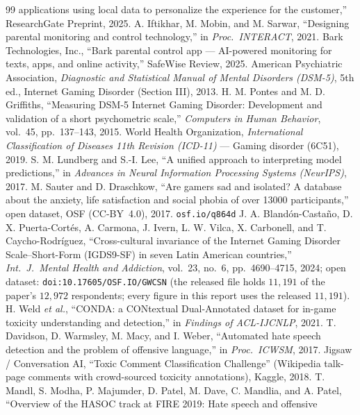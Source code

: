 \documentclass[11pt,a4paper]{article}
\begin{document}
\begin{thebibliography}{99}
applications using local data to personalize the experience for the customer,''
ResearchGate Preprint, 2025.
 A. Iftikhar, M. Mobin, and M. Sarwar, ``Designing parental
monitoring and control technology,'' in \emph{Proc.\ INTERACT}, 2021.
 Bark Technologies, Inc., ``Bark parental control app --- AI-powered
monitoring for texts, apps, and online activity,'' SafeWise Review, 2025.
 American Psychiatric Association, \emph{Diagnostic and Statistical Manual
of Mental Disorders (DSM-5)}, 5th ed., Internet Gaming Disorder (Section III), 2013.
 H. M. Pontes and M. D. Griffiths, ``Measuring DSM-5 Internet Gaming
Disorder: Development and validation of a short psychometric scale,'' \emph{Computers in
Human Behavior}, vol.\ 45, pp.\ 137--143, 2015.
 World Health Organization, \emph{International Classification of Diseases
11th Revision (ICD-11)} --- Gaming disorder (6C51), 2019.
 S. M. Lundberg and S.-I. Lee, ``A unified approach to interpreting
model predictions,'' in \emph{Advances in Neural Information Processing Systems
(NeurIPS)}, 2017.
 M. Sauter and D. Draschkow, ``Are gamers sad and isolated? A database
about the anxiety, life satisfaction and social phobia of over 13000 participants,''
open dataset, OSF (CC-BY~4.0), 2017. \texttt{osf.io/q864d}
 J. A. Bland\'on-Casta\~no, D. X. Puerta-Cort\'es, A. Carmona,
J. Ivern, L. W. Vilca, X. Carbonell, and T. Caycho-Rodr\'iguez, ``Cross-cultural invariance of
the Internet Gaming Disorder Scale--Short-Form (IGDS9-SF) in seven Latin American countries,''
\emph{Int.\ J.\ Mental Health and Addiction}, vol.~23, no.~6, pp.~4690--4715, 2024;
open dataset: \texttt{doi:10.17605/OSF.IO/GWCSN} (the released file holds $11{,}191$ of the
paper's $12{,}972$ respondents; every figure in this report uses the released $11{,}191$).
 H. Weld \emph{et al.}, ``CONDA: a CONtextual Dual-Annotated dataset
for in-game toxicity understanding and detection,'' in \emph{Findings of ACL-IJCNLP},
2021.
 T. Davidson, D. Warmsley, M. Macy, and I. Weber, ``Automated hate
speech detection and the problem of offensive language,'' in \emph{Proc.\ ICWSM}, 2017.
 Jigsaw / Conversation AI, ``Toxic Comment Classification
Challenge'' (Wikipedia talk-page comments with crowd-sourced toxicity annotations),
Kaggle, 2018.
 T. Mandl, S. Modha, P. Majumder, D. Patel, M. Dave, C. Mandlia,
and A. Patel, ``Overview of the HASOC track at FIRE 2019: Hate speech and offensive

\end{thebibliography}
\end{document}
